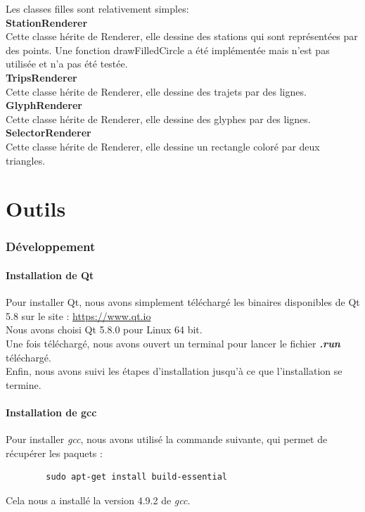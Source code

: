 \documentclass[12pt]{article}
\begin{document}
		Les classes filles sont relativement simples:\\
		
		\textbf{StationRenderer}\\
		Cette classe hérite de Renderer, elle dessine des stations qui sont représentées par des points. Une fonction drawFilledCircle a été implémentée mais n’est pas utilisée et n’a pas été testée.\\
		
		\textbf{TripsRenderer}\\
		Cette classe hérite de Renderer, elle dessine des trajets par des lignes. \\

		\textbf{GlyphRenderer}\\
		Cette classe hérite de Renderer, elle dessine des glyphes par des lignes. \\
		
		\textbf{SelectorRenderer}\\
		Cette classe hérite de Renderer, elle dessine un rectangle coloré par deux triangles.
		
\newpage
\part{Outils}
	\section{Développement}
		\subsection{Installation de Qt}
		Pour installer Qt, nous avons simplement téléchargé les binaires disponibles de Qt 5.8
		sur le site :  \url{https://www.qt.io} \\
		
		Nous avons choisi Qt 5.8.0 pour Linux 64 bit.\\
		Une fois téléchargé, nous avons ouvert un terminal pour lancer le fichier \textit{\textbf{.run}} téléchargé.\\
		Enfin, nous avons suivi les étapes d'installation jusqu'à ce que l'installation se termine.
		
		\subsection{Installation de gcc}
		Pour installer \textit{gcc}, nous avons utilisé la commande suivante, qui permet de récupérer les paquets :
		\begin{verbatim}
		sudo apt-get install build-essential
		\end{verbatim}
		Cela nous a installé la version 4.9.2 de \textit{gcc}.
		
\end{document}
